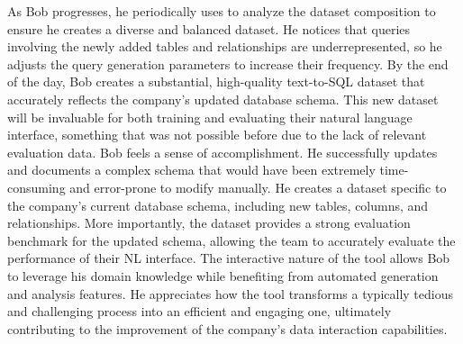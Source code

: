 As Bob progresses, he periodically uses {\tool} to analyze the dataset composition to ensure he creates a diverse and balanced dataset. He notices that queries involving the newly added tables and relationships are underrepresented, so he adjusts the query generation parameters to increase their frequency.
By the end of the day, Bob creates a substantial, high-quality text-to-SQL dataset that accurately reflects the company's updated database schema. This new dataset will be invaluable for both training and evaluating their natural language interface, something that was not possible before due to the lack of relevant evaluation data.
Bob feels a sense of accomplishment. He successfully updates and documents a complex schema that would have been extremely time-consuming and error-prone to modify manually. He creates a dataset specific to the company's current database schema, including new tables, columns, and relationships. More importantly, the dataset provides a strong evaluation benchmark for the updated schema, allowing the team to accurately evaluate the performance of their NL interface.
The interactive nature of the tool allows Bob to leverage his domain knowledge while benefiting from automated generation and analysis features. He appreciates how the tool transforms a typically tedious and challenging process into an efficient and engaging one, ultimately contributing to the improvement of the company's data interaction capabilities.